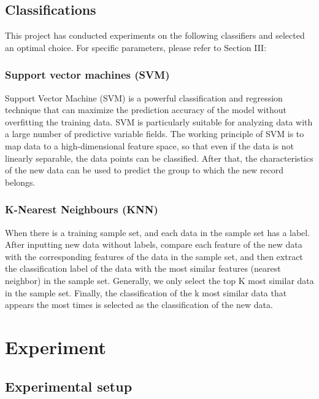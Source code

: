 \documentclass[conference]{IEEEtran}
\begin{document}
\subsection{Classifications}
This project has conducted experiments on the following classifiers and selected an optimal choice. For specific parameters, please refer to Section III:
\subsubsection{Support vector machines (SVM)}
Support Vector Machine (SVM) is a powerful classification and regression technique that can maximize the prediction accuracy of the model without overfitting the training data. SVM is particularly suitable for analyzing data with a large number of predictive variable fields. The working principle of SVM is to map data to a high-dimensional feature space, so that even if the data is not linearly separable, the data points can be classified. After that, the characteristics of the new data can be used to predict the group to which the new record belongs.

\subsubsection{K-Nearest Neighbours (KNN)}
When there is a training sample set, and each data in the sample set has a label. After inputting new data without labels, compare each feature of the new data with the corresponding features of the data in the sample set, and then extract the classification label of the data with the most similar features (nearest neighbor) in the sample set. Generally, we only select the top K most similar data in the sample set. Finally, the classification of the k most similar data that appears the most times is selected as the classification of the new data.


\section{Experiment}
\subsection{Experimental setup}
\end{document}
